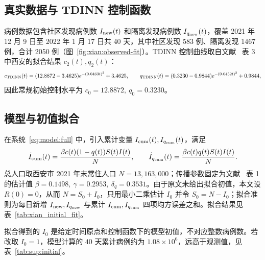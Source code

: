 \documentclass[lang=cn,a4paper,newtx]{elegantpaper}
\numberwithin{equation}{section}
\theoremstyle{plain}
\begin{document}
\subsection{真实数据与 TDINN 控制函数}
病例数据包含社区发现病例数 $I_{\rm new}(t)$ 和隔离发现病例数 $I_{q_{\rm new}}(t)$，覆盖 2021 年 12 月 9 日至 2022 年 1 月 17 日共 40 天，其中社区发现 583 例、隔离发现 1467 例，合计 2050 例（图~\ref{fig:xian:observed-fit}）。TDINN 控制曲线取自文献~\cite{He2023TDINN} 表 3 中西安的拟合结果 $c_2(t),q_2(t)$：
\begin{equation}
c_{\rm TDINN}(t)=(12.8872-3.4625)e^{-(0.0463t)^2}+3.4625,\qquad
q_{\rm TDINN}(t)=(0.3230-0.9844)e^{-(0.0452t)^2}+0.9844,
\end{equation}
因此常规初始控制水平为 $c_0=12.8872,\ q_0=0.3230$。


\subsection{模型与初值拟合}
在系统~\eqref{eq:model:full} 中，引入累计变量 $I_{\rm cum}(t),I_{q_{\rm cum}}(t)$，满足
\begin{equation}
\dot I_{\rm cum}(t)=\frac{\beta c(t)(1-q(t))S(t)I(t)}{N},\qquad
\dot I_{q_{\rm cum}}(t)=\frac{\beta c(t)q(t)S(t)I(t)}{N}.
\end{equation}
总人口取西安市 2021 年末常住人口 $N=13{,}163{,}000$；传播参数固定为文献~\cite{He2023TDINN} 表 1 的估计值 $\beta=0.1498,\ \gamma=0.2953,\ \delta_q=0.3531$。由于原文未给出拟合初值，本文设 $R(0)=0$，从而 $N=S_0+I_0$，只用最小二乘估计 $I_0$ 并令 $S_0=N-I_0$；拟合准则为每日新增 $I_{\rm new},I_{q_{\rm new}}$ 与累计 $I_{\rm cum},I_{q_{\rm cum}}$ 四项均方误差之和。拟合结果见表~\ref{tab:xian_initial_fit}。

拟合得到的 $I_0$ 是给定时间原点和控制函数下的模型初值，不对应整数病例数。若改取 $I_0=1$，模型计算的 $40$ 天累计病例约为 $1.08\times10^6$，远高于观测值，见表~\ref*{tab:sup:initial}。
\end{document}
